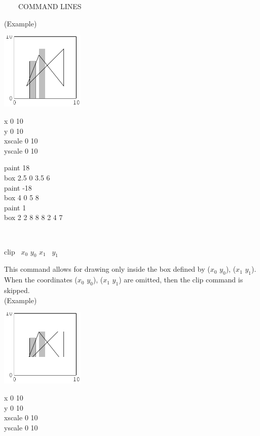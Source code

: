 \begin{qsection}{\ ~~~COMMAND LINES}
\begin{minipage}[t]{9cm}
(Example)\\
\begin{minipage}[t]{4.3cm}
 \includegraphics[width=4cm]{fig/box.pdf}
\end{minipage}
\begin{minipage}[b]{4.5cm}
\baselineskip 5pt
x 0 10\\
y 0 10\\
xscale 0 10\\
yscale 0 10

\vspace*{3mm}
paint 18\\
box 2.5 0 3.5 6\\
paint -18 \\
box 4 0 5 8\\
paint 1\\
box  2 2 8 8 8 2 4 7
\end{minipage}
\end{minipage}\\

\begin{minipage}[t]{5.5cm}
clip ~$x_0$ $y_0$ $x_1$ ~$y_1$ 
\end{minipage}
\begin{minipage}[t]{9cm}
This command allows for drawing only inside the box defined by
($x_0$ $y_0$), ($x_1$ $y_1$).
When the coordinates ($x_0$ $y_0$), ($x_1$ $y_1$) are omitted,
then the clip command is skipped.\\

(Example)\\
\begin{minipage}[t]{4.3cm}
 \includegraphics[width=4cm]{fig/clip.pdf}
\end{minipage}
\begin{minipage}[b]{4.5cm}
\baselineskip 5pt
x 0 10\\
y 0 10\\
xscale 0 10\\
yscale 0 10


\end{minipage}
\end{minipage}
\end{qsection}

